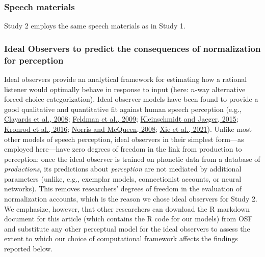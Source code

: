 \documentclass[utf8]{frontiersSCNS}
\begin{document}
\hypertarget{sec:speechMaterialsII}{%
\subsubsection*{Speech materials}\label{sec:speechMaterialsII}}

Study 2 employs the same speech materials as in Study 1.

\hypertarget{sec:IOs}{%
\subsubsection*{Ideal Observers to predict the consequences of normalization for perception}\label{sec:IOs}}

Ideal observers provide an analytical framework for estimating how a rational listener would optimally behave in response to input (here: \(n\)-way alternative forced-choice categorization). Ideal observer models have been found to provide a good qualitative and quantitative fit against human speech perception (e.g., \protect\hyperlink{ref-clayards2008}{Clayards et al., 2008}; \protect\hyperlink{ref-feldman2009}{Feldman et al., 2009}; \protect\hyperlink{ref-kleinschmidt-jaeger2015}{Kleinschmidt and Jaeger, 2015}; \protect\hyperlink{ref-kronrod2016}{Kronrod et al., 2016}; \protect\hyperlink{ref-norris-mcqueen2008}{Norris and McQueen, 2008}; \protect\hyperlink{ref-xie2021cognition}{Xie et al., 2021}). Unlike most other models of speech perception, ideal observers in their simplest form---as employed here---have zero degrees of freedom in the link from production to perception: once the ideal observer is trained on phonetic data from a database of \emph{productions}, its predictions about \emph{perception} are not mediated by additional parameters (unlike, e.g., exemplar models, connectionist accounts, or neural networks). This removes researchers' degrees of freedom in the evaluation of normalization accounts, which is the reason we chose ideal observers for Study 2. We emphasize, however, that other researchers can download the R markdown document for this article (which contains the R code for our models) from OSF and substitute any other perceptual model for the ideal observers to assess the extent to which our choice of computational framework affects the findings reported below.
\end{document}
